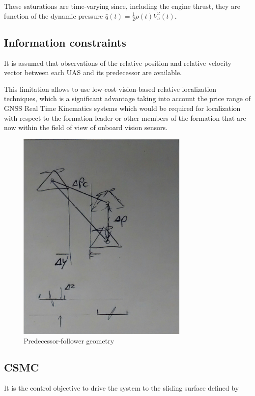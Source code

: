 \documentclass{ifacconf}
\begin{document}
These saturations are time-varying since, including the engine thrust, they are function of the dynamic pressure $\bar{q}(t) = \frac{1}{2}\rho(t) V_a^2(t)$.

\subsection{Information constraints}
It is assumed that observations of the relative position and relative velocity vector between each UAS and its predecessor are available.

This limitation allows to use low-cost vision-based relative localization techniques, which is a significant advantage taking into account the price range of GNSS Real Time Kinematics systems which would be required for localization with respect to the formation leader or other members of the formation that are now within the field of view of onboard vision sensors.

\begin{figure}
\begin{center}
\includegraphics[width=8.4cm]{geometry}    %
\caption{Predecessor-follower geometry}
\label{fig:geometry}
\end{center}
\end{figure}

\subsection{CSMC}

It is the control objective to drive the system to the sliding surface defined by
\end{document}
